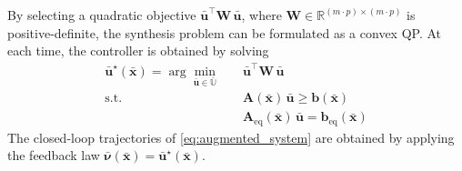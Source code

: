 \documentclass[journal,twoside,web]{ieeecolor}
\begin{document}
By selecting a quadratic objective $\bar{\mathbf{u}}^\top \mathbf{W} \, \bar{\mathbf{u}}$, where $\mathbf{W} \in \mathbb{R}^{(m \cdot p) \times (m \cdot p)}$ is positive-definite, the synthesis problem can be formulated as a convex QP. At each time, the controller is obtained by solving
\begin{equation}
\label{eq:qp}
    \begin{aligned}
        \bar{\mathbf{u}}^\star(\bar{\mathbf{x}})  = \arg\min_{\bar{\mathbf{u}} \in \bar{\mathbb{U}}} \quad
        & \bar{\mathbf{u}}^\top \mathbf{W} \, \bar{\mathbf{u}} \\
        \mathrm{s.t.} \quad
        & \mathbf{A} (\bar{\mathbf{x}}) \, \bar{\mathbf{u}} \ge \mathbf{b} (\bar{\mathbf{x}}) \\
        & \mathbf{A}_\mathrm{eq} (\bar{\mathbf{x}}) \, \bar{\mathbf{u}} = \mathbf{b}_\mathrm{eq} (\bar{\mathbf{x}})
    \end{aligned}
\end{equation}
The closed-loop trajectories of \eqref{eq:augmented_system} are obtained by applying the feedback law $\bar{\boldsymbol{\nu}}(\bar{\mathbf{x}}) = \bar{\mathbf{u}}^\star(\bar{\mathbf{x}})$.
\end{document}
